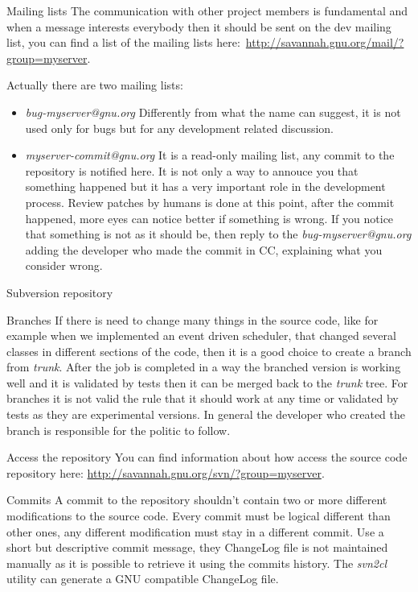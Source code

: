 \documentclass[12pt]{article}
\begin{document}
\begin{section}{Mailing lists}\label{section:ml}
The communication with other project members is fundamental and when a
message interests everybody then it should be sent on the dev mailing
list, you can find a list of the mailing lists
here:~\url{http://savannah.gnu.org/mail/?group=myserver}.

Actually there are two mailing lists:
\begin{itemize}
\item \textit{bug-myserver@gnu.org} Differently from what the name can
  suggest, it is not used only for bugs but for any development
  related discussion.
\item \textit{myserver-commit@gnu.org} It is a read-only mailing list,
  any commit to the repository is notified here.  It is not only a way
  to annouce you that something happened but it has a very important
  role in the development process.  Review patches by humans is done
  at this point, after the commit happened, more eyes can notice
  better if something is wrong.  If you notice that something is not
  as it should be, then reply to the \textit{bug-myserver@gnu.org}
  adding the developer who made the commit in CC, explaining what you
  consider wrong.
\end{itemize}
\end{section}

\begin{section}{Subversion repository}\label{section:svn}
\begin{subsection}{Branches}
If there is need to change many things in the source code, like for
example when we implemented an event driven scheduler, that changed
several classes in different sections of the code, then it is a good
choice to create a branch from \textit{trunk}.
After the job is completed in a way the branched version is working
well and it is validated by tests then it can be merged back to the
\textit{trunk} tree.
For branches it is not valid the rule that it should work at any time
or validated by tests as they are experimental versions.  In general
the developer who created the branch is responsible for the politic to
follow.
\end{subsection}

\begin{subsection}{Access the repository}
You can find information about how access the source code repository here:
\url{http://savannah.gnu.org/svn/?group=myserver}.
\end{subsection}

\begin{subsection}{Commits}
A commit to the repository shouldn't contain two or more different
modifications to the source code.
Every commit must be logical different than other ones, any different
modification must stay in a different commit.
Use a short but descriptive commit message, they ChangeLog file is not
maintained manually as it is possible to retrieve it using the commits
history.  The \textit{svn2cl} utility can generate a GNU compatible
ChangeLog file.
\end{subsection}
\end{section}
\end{document}
